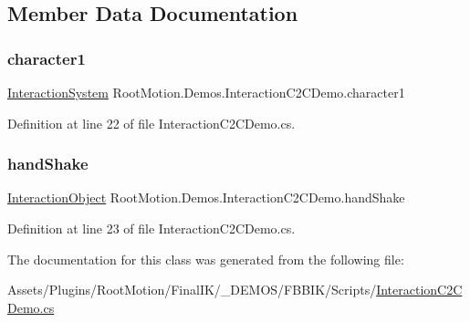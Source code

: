 \subsection{Member Data Documentation}
\mbox{\label{class_root_motion_1_1_demos_1_1_interaction_c2_c_demo_ab13341213d4b77855842340d9fedaeda}} 
\subsubsection{\texorpdfstring{character1}{character1}}
{\footnotesize\ttfamily \mbox{\hyperlink{class_root_motion_1_1_final_i_k_1_1_interaction_system}{Interaction\+System}} Root\+Motion.\+Demos.\+Interaction\+C2\+C\+Demo.\+character1}



Definition at line 22 of file Interaction\+C2\+C\+Demo.\+cs.

\mbox{\label{class_root_motion_1_1_demos_1_1_interaction_c2_c_demo_aa7208fc073771f11774223a9c052ef9b}} 
\subsubsection{\texorpdfstring{hand\+Shake}{handShake}}
{\footnotesize\ttfamily \mbox{\hyperlink{class_root_motion_1_1_final_i_k_1_1_interaction_object}{Interaction\+Object}} Root\+Motion.\+Demos.\+Interaction\+C2\+C\+Demo.\+hand\+Shake}



Definition at line 23 of file Interaction\+C2\+C\+Demo.\+cs.



The documentation for this class was generated from the following file\+:\begin{DoxyCompactItemize}
\item 
Assets/\+Plugins/\+Root\+Motion/\+Final\+I\+K/\+\_\+\+D\+E\+M\+O\+S/\+F\+B\+B\+I\+K/\+Scripts/\mbox{\hyperlink{_interaction_c2_c_demo_8cs}{Interaction\+C2\+C\+Demo.\+cs}}\end{DoxyCompactItemize}
